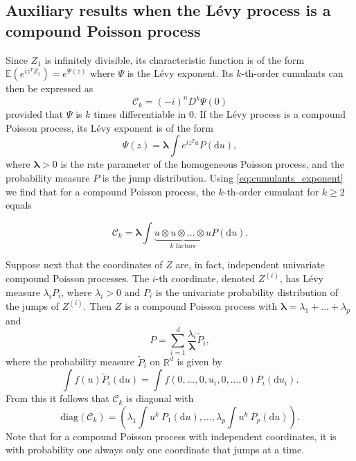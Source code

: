 \documentclass{biometrika}
\begin{document}
\subsection{Auxiliary results when the Lévy process is a compound Poisson process} \label{sec:AuxResultsCompoundPoisson}

Since $Z_1$ is infinitely divisible, its characteristic function is of the form
$\mathbb{E}(e^{iz^TZ_1}) = e^{\Psi(z)}$ where $\Psi$ is the Lévy 
exponent. Its $k$-th-order cumulants can then be expressed as
\begin{equation}
    \label{eq:cumulants_exponent}
	\mathcal{C}_k = (-i)^n D^k\Psi(0)
\end{equation}
provided that $\Psi$ is $k$ times differentiable in $0$. If the Lévy process is 
a compound Poisson process, its Lévy exponent is of the form 
\[
    \Psi(z) = \boldsymbol{\lambda} \int e^{iz^Tu} P(\mathrm{d} u), 
\]
where $\boldsymbol{\lambda}  > 0$ is the rate parameter of the homogeneous Poisson process, and 
the probability measure $P$ is the jump distribution. Using \eqref{eq:cumulants_exponent}
we find that for a compound Poisson process, the $k$-th-order cumulant for $k \geq 2$ equals

\begin{equation}
    \label{eq:comp_pois_cum}
	\mathcal{C}_k = \boldsymbol{\lambda}  \int \underbrace{u \otimes u \otimes \ldots \otimes u}_{k \text{ factors}} P(\mathrm{d} u). 
\end{equation}

Suppose next that the coordinates of $Z$ are, in fact, independent univariate compound Poisson processes.
The $i$-th coordinate, denoted $Z^{(i)}$, has Lévy measure $\lambda_i P_i$, where $\lambda_i > 0$ 
and $P_i$ is the univariate probability distribution of the jumps of $Z^{(i)}$. Then $Z$ is a 
compound Poisson process with $\boldsymbol{\lambda}  = \lambda_1 + \ldots + \lambda_p$
and
$$
	P = \sum_{i=1}^d \frac{\lambda_i}{\boldsymbol{\lambda} } \tilde{P}_i,
$$
where the probability measure $\tilde{P}_i$ on $\mathbb{R}^d$ is given by
$$
	\int f(u) \tilde{P}_i(\mathrm{d}u) = \int f(0, \ldots, 0, u_i, 0, \ldots, 0) P_i(\mathrm{d} u_i).
$$
From this it follows that $\mathcal{C}_k$ is diagonal with
\begin{equation}
    \label{eq:comp_pois_diag_cum}
	\mathrm{diag}(\mathcal{C}_k) = \left(
	\lambda_1 \int u^k \ P_1(\mathrm{d} u), \ldots, \lambda_p \int u^k \ P_p(\mathrm{d} u)\right).
\end{equation}
Note that for a compound Poisson process with independent coordinates, it is with probability one
always only one coordinate that jumps at a time.
\end{document}
